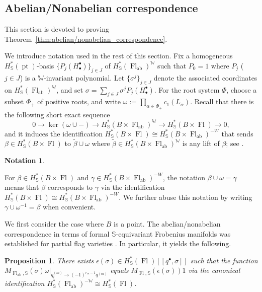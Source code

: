 \documentclass[a4paper,12pt]{amsart}
\numberwithin{equation}{section}
\newtheorem{proposition}[theorem]{Proposition}
\theoremstyle{definition}
\newtheorem{notation}[theorem]{Notation}
\newcommand{\bbS}{\mathbb{S}}
\newcommand{\W}{\mathbb{W}}
\newcommand{\pt}{\operatorname{pt}}
\newcommand{\Fl}{\operatorname{Fl}}
\newcommand{\FlG}{\operatorname{Fl}}
\newcommand{\FlT}{\operatorname{Fl}_{\operatorname{ab}}}
\begin{document}
\subsection{Abelian/Nonabelian correspondence}\label{subsection:ab/nonab}

This section is devoted to proving Theorem~\ref{thm:abelian/nonabelian_correspondence}.

We introduce notation used in the rest of this section. 
Fix a homogeneous $H^*_\bbS(\pt)$-basis $\{P_j(H_\bullet^\bullet)\}_{j\in J}$ of $H^*_\bbS(\FlT)^\W$ such that $P_0=1$ where $P_j$ ($j\in J$) is a $\W$-invariant polynomial.
Let $\{\sigma^j\}_{j\in J}$ denote the associated coordinates on $H^*_\bbS(\FlT)^\W$, and set $\sigma=\sum_{j\in J}\sigma^jP_j(H_\bullet^\bullet)$.
For the root system $\Phi$, choose a subset $\Phi_+$ of positive roots, and write $\omega:=\prod_{\alpha\in\Phi_+}c_1(L_\alpha)$.
Recall that there is the following short exact sequence
\[
0 \to \ker(\omega\cup-) \to H^*_\bbS(B\times\FlT)^\W \to H^*_\bbS(B\times\FlG) \to 0,
\]
and it induces the identification $H^*_\bbS(B\times\FlG) \cong H^*_\bbS(B\times\FlT)^{-W}$ that sends $\beta\in H^*_\bbS(B\times\FlG)$ to $\widetilde{\beta}\cup\omega$ where $\widetilde{\beta}\in H^*_\bbS(B\times\FlT)^\W$ is any lift of $\beta$; see \cite{Martin}.

\begin{notation}\label{cup omega}
    
For $\beta\in H^*_\bbS(B\times\FlG)$ and $\gamma \in H^*_\bbS(B\times\FlT)^{-W}$, the notation $\beta \cup \omega = \gamma$ means that $\beta$ corresponds to $\gamma$ via the identification $H^*_\bbS(B\times\FlG) \cong H^*_\bbS(B\times\FlT)^{-W}$.
We further abuse this notation by writing $\gamma\cup\omega^{-1} = \beta$ when convenient.

\end{notation}

We first consider the case where $B$ is a point.
The abelian/nonabelian correspondence in terms of formal $\bbS$-equivariant Frobenius manifolds \cite[Conjecture 3.7.1]{CFKS} was established for partial flag varieties \cite[Theorem 4.1.1]{CFKS}.
In particular, it yields the following.

\begin{proposition}\label{prop:correspondence_J-function}
    There exists $\epsilon(\sigma)\in H^*_\bbS(\Fl)[\![q^\bullet,\sigma]\!]$ such that the function $M_{\FlT,\bbS}(\sigma)\omega|_{q^{(m)}_i\to (-1)^{r_m-1} q^{(m)}}$ equals $M_{\FlG,\bbS}(\epsilon(\sigma))1$ via the canonical identification $H^*_\bbS(\FlT)^{-\W}\cong H^*_\bbS(\Fl)$. 
\end{proposition}
\end{document}
